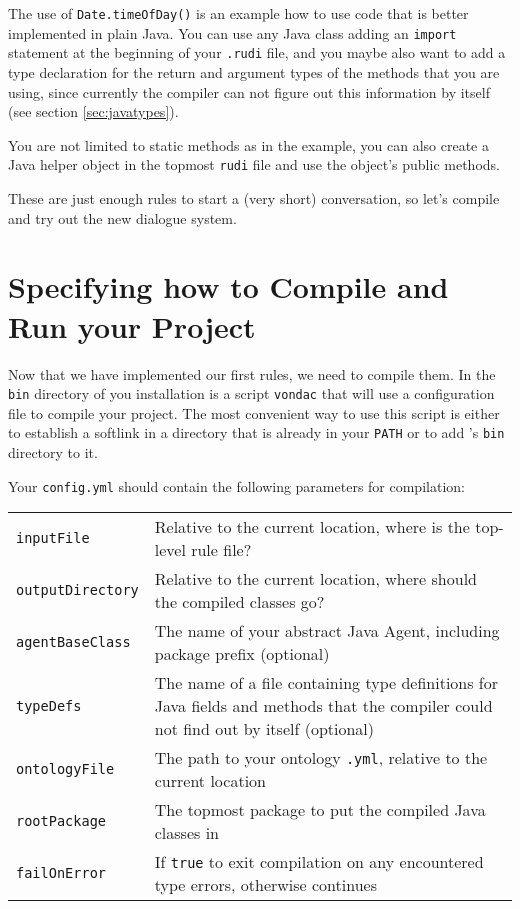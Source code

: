 The use of \texttt{Date.timeOfDay()} is an example how to use code
that is better implemented in plain Java. You can use any Java class
adding an \texttt{import} statement at the beginning of your
\texttt{.rudi} file, and you maybe also want to add a type declaration
for the return and argument types of the methods that you are using,
since currently the compiler can not figure out this information by
itself (see section \ref{sec:javatypes}).

You are not limited to static methods as in the example, you can also
create a Java helper object in the topmost \texttt{rudi} file and use
the object's public methods.

These are just enough rules to start a (very short) conversation, so
let's compile and try out the new dialogue system.

\section{Specifying how to Compile and Run your Project}

Now that we have implemented our first rules, we need to compile them. In the
\texttt{bin} directory of you \vonda installation is a script \texttt{vondac}
that will use a configuration file to compile your project. The most convenient
way to use this script is either to establish a softlink in a directory that is
already in your \texttt{PATH} or to add \vonda's \texttt{bin} directory to it.

Your \texttt{config.yml} should contain the following parameters for compilation:\\

\begin{tabular}{lp{}}
\texttt{inputFile}& Relative to the current location, where is the
                     top-level rule file?\\
\texttt{outputDirectory}& Relative to the current location, where
                           should the compiled classes go?\\
\texttt{agentBaseClass}& The name of your abstract Java Agent, including
                          package prefix (optional)\\
\texttt{typeDefs}& The name of a file containing type definitions
                    for Java fields and methods that the compiler
                    could not find out by itself (optional)\\
\texttt{ontologyFile}&The path to your ontology \texttt{.yml},
                        relative to the current location\\
\texttt{rootPackage}&The topmost package to put the compiled Java
                       classes in\\
\texttt{failOnError}&If \texttt{true} to exit compilation on any
                       encountered type errors, otherwise continues\\
\end{tabular}\\

